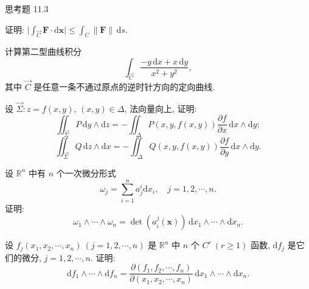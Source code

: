 \begin{exblock}{思考题 11.3}
\item 证明: $\bigl|\int_{\overrightarrow{C}}\boldsymbol{F}\cdot\mathrm{d}\boldsymbol{x}\bigr|\leqslant\int_{C}\lVert\boldsymbol{F}\rVert\,\mathrm{d}s$.
\item 计算第二型曲线积分
  \[
  \int_{\overrightarrow{C}}\frac{-y\,\mathrm{d}x+x\,\mathrm{d}y}{x^{2}+y^{2}},
  \]
  其中 $\overrightarrow{C}$ 是任意一条不通过原点的逆时针方向的定向曲线.
\item 设 $\overrightarrow{\Sigma}:z=f(x,y)$, $(x,y)\in\Delta$, 法向量向上, 证明:
  \[
  \iint_{\overrightarrow{\Sigma}}P\,\mathrm{d}y\wedge\mathrm{d}z=-\iint_{\Delta}P(x,y,f(x,y))\frac{\partial f}{\partial x}\,\mathrm{d}x\wedge\mathrm{d}y;
  \]
  \[
  \iint_{\overrightarrow{\Sigma}}Q\,\mathrm{d}z\wedge\mathrm{d}x=-\iint_{\Delta}Q(x,y,f(x,y))\frac{\partial f}{\partial y}\,\mathrm{d}x\wedge\mathrm{d}y.
  \]
\item 设 $\mathbb{R}^{n}$ 中有 $n$ 个一次微分形式
  \[
  \omega_{j}=\sum_{i=1}^{n}a_{j}^{i}\mathrm{d}x_{i},\quad j=1,2,\cdots,n.
  \]
  证明:
  \[
  \omega_{1}\wedge\cdots\wedge\omega_{n}=\det(a_{i}^{j}(\boldsymbol{x}))\,\mathrm{d}x_{1}\wedge\cdots\wedge\mathrm{d}x_{n}.
  \]
\item 设 $f_{j}(x_{1},x_{2},\cdots,x_{n})\ (j=1,2,\cdots,n)$ 是 $\mathbb{R}^{n}$ 中 $n$ 个 $C^{r}\ (r\geqslant1)$ 函数, $\mathrm{d}f_{j}$ 是它们的微分, $j=1,2,\cdots,n$. 证明:
  \[
  \mathrm{d}f_{1}\wedge\cdots\wedge\mathrm{d}f_{n}=\frac{\partial(f_{1},f_{2},\cdots,f_{n})}{\partial(x_{1},x_{2},\cdots,x_{n})}\,\mathrm{d}x_{1}\wedge\cdots\wedge\mathrm{d}x_{n}.
  \]
\end{exblock}